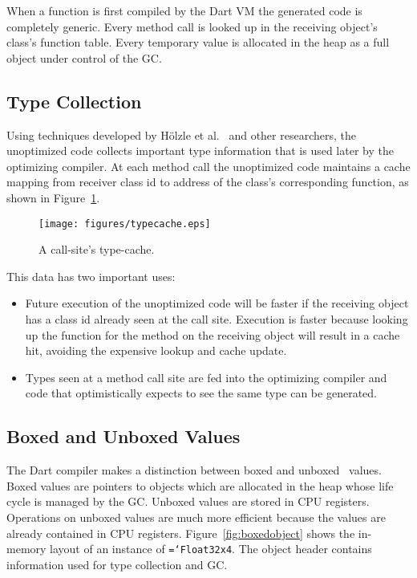 \documentclass[preprint]{sigplanconf}
\newcommand{\ttt}[1]{{\texttt{\hyphenchar\font=`\-\relax #1}}}%
\begin{document}
When a function is first compiled by the Dart VM the generated code is
completely generic. Every method call is looked up in the receiving object's
class's function table. Every temporary value is allocated in the heap as a full
object under control of the GC.

\subsection{Type Collection}

Using techniques developed by H\"{o}lzle et al.~\cite{typefeedback} and other
researchers, the unoptimized code collects important type information that is
used later by the optimizing compiler. At each method call the unoptimized code
maintains a cache mapping from receiver class id to address of the
class's corresponding function, as shown in Figure~\ref{fig:typecache}.

\begin{figure}
\begin{center}
\texttt{[image: figures/typecache.eps]}
\end{center}
\caption{A call-site's type-cache.}
\label{fig:typecache}
\end{figure}

This data has two important uses:
\begin{itemize}
\item
Future execution of the unoptimized code will be faster if the receiving object
has a class id already seen at the call site. Execution is faster because
looking up the function for the method on the receiving object will result in a
cache hit, avoiding the expensive lookup and cache update.

\item
Types seen at a method call site are fed into the optimizing compiler and code
that optimistically expects to see the same type can be generated.
\end{itemize}

\subsection{Boxed and Unboxed Values}
\label{boxing}

The Dart compiler makes a distinction between boxed and unboxed~\cite{unboxing}
values. Boxed values are pointers to objects which are allocated in the heap
whose life cycle is managed by the GC. Unboxed values are stored in CPU
registers. Operations on unboxed values are much more efficient because the
values are already contained in CPU registers. Figure~\ref{fig:boxedobject}
shows the in-memory layout of an instance of \ttt{Float32x4}. The object header
contains information used for type collection and GC.
\end{document}
